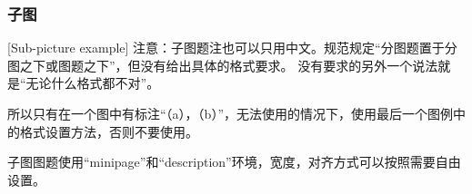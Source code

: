 \begin{figure}[htbp]
\begin{minipage}[t]{0.4\textwidth}
  \end{minipage}
\end{figure}

\subsubsection{子图}[Sub-picture example]
注意：子图题注也可以只用中文。规范规定“分图题置于分图之下或图题之下”，但没有给出具体的格式要求。
没有要求的另外一个说法就是“无论什么格式都不对”。

所以只有在一个图中有标注“（a），（b）”，无法使用的情况下，使用最后一个图例中的格式设置方法，否则不要使用。

子图图题使用“minipage”和“description”环境，宽度，对齐方式可以按照需要自由设置。

